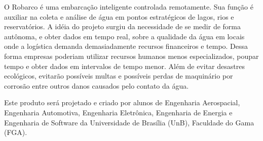 O Robarco é uma embarcação inteligente controlada remotamente. Sua função é auxiliar na coleta e análise de água em pontos estratégicos de lagos, rios e reservatórios. A idéia do projeto surgiu da necessidade de se medir de forma autônoma, e obter dados em tempo real, sobre a qualidade da água em locais onde a logística demanda demasiadamente recursos financeiros e tempo. Dessa forma empresas poderiam utilizar recursos humanos menos especializados, poupar tempo e obter dados em intervalos de tempo menor. Além de evitar desastres ecológicos, evitarão possíveis multas e possíveis perdas de maquinário por corrosão entre outros danos causados pelo contato da água.

Este produto será projetado e criado por alunos de Engenharia Aerospacial, Engenharia Automotiva, Engenharia Eletrônica, Engenharia de Energia e Engenharia de Software da Universidade de Brasília (UnB), Faculdade do Gama (FGA).


